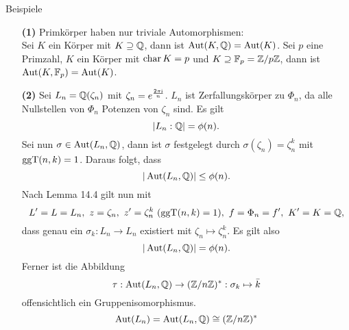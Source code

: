 \begin{genericdf}{Beispiele}\label{skript:14.5}
	\begin{itemize}
		\item[\textbf{(1)}]
		Primkörper haben nur triviale Automorphismen:\\
		Sei $K$ ein Körper mit $K\supseteq\mathbb{Q}$, dann ist $\operatorname{Aut} (K, \mathbb{Q})=\operatorname{Aut} (K)$.
		Sei $p$ eine Primzahl, $K$ ein Körper mit $\operatorname{char} K=p$ und $K\supseteq\mathbb{F}_p=\mathbb{Z}/p\mathbb{Z}$, dann ist $\operatorname{Aut}(K,\mathbb{F}_p)=\operatorname{Aut}(K)$.
		\item[\textbf{(2)}]
		Sei $L_n = \mathbb{Q} (\zeta_n)$ mit $\zeta_n = e^{\frac{2 \pi \textrm{i}}{n}}$. $L_n$ ist Zerfallungskörper zu $\Phi_n$, da alle Nullstellen von $\Phi_n$ Potenzen von $\zeta_n$ sind. Es gilt
		\[|L_n : \mathbb{Q} | = \phi(n).\]
		Sei nun $\sigma \in \operatorname{Aut}(L_n, \mathbb{Q})$, dann ist $\sigma$ festgelegt durch $\sigma (\zeta_n)=\zeta_n^k$ mit $\operatorname{ggT}(n,k)=1$. Daraus folgt, dass
		\[|\operatorname{Aut} (L_n, \mathbb{Q})| \leq \phi (n).\]
		Nach Lemma 14.4 gilt nun mit
		\[L'=L=L_n,\ z=\zeta_n,\ z'= \zeta_n^{k}\ (\ggT(n,k)=1),\ f=\Phi_n=f',\ K'=K=\Q,\]
		dass genau ein $\sigma_k: L_n\to L_n$ existiert mit $\zeta_n\mapsto\zeta_n^k$. Es gilt also
		\[|\operatorname{Aut} (L_n, \mathbb{Q})| = \phi (n).\]
		Ferner ist die Abbildung
		\[\tau: \operatorname{Aut}(L_n,\mathbb{Q})\to(\mathbb{Z}/n\mathbb{Z})^\ast: \sigma_k\mapsto\bar{k}\]
		offensichtlich ein Gruppenisomorphismus.
		\[\operatorname{Aut}(L_n)=\operatorname{Aut}(L_n,\mathbb{Q})\cong(\mathbb{Z}/n\mathbb{Z})^\ast\]
	\end{itemize}
\end{genericdf}

